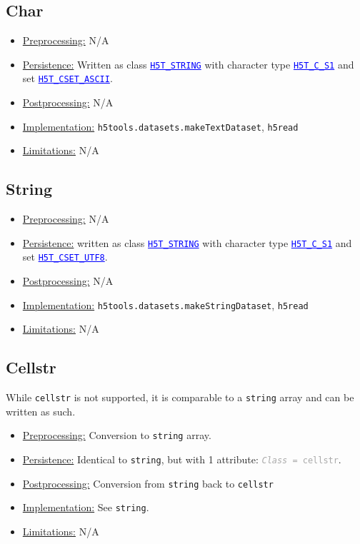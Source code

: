 \documentclass[11pt]{exam}
\newcommand\myurl[1]{\textcolor{blue}{\underline{#1}}}
\newcommand\myfcn[1]{\colorbox{codegray}{\textcolor{codeblue}{\texttt{#1}}}}
\newcommand\matfcn[1]{\textcolor{darkteal}{\texttt{#1}}}
\newcommand\hdftype[1]{\texttt{\myurl{#1}}}
\newcommand\myatt[2]{\textcolor{darkgray}{\texttt{\textit{#1} = #2}}}
\begin{document}
		\subsection{Char}
		\noindent\begin{itemize}
			\item \underline{Preprocessing:} N/A 
			\item \underline{Persistence:} Written as class \hdftype{H5T\_STRING} with character type \hdftype{H5T\_C\_S1} and set \hdftype{H5T\_CSET\_ASCII}.
			\item \underline{Postprocessing:} N/A
			\item \underline{Implementation:} \myfcn{h5tools.datasets.makeTextDataset}, \matfcn{h5read}
			\item \underline{Limitations:} N/A
		\end{itemize}

		\subsection{String}
		\noindent\begin{itemize}
			\item \underline{Preprocessing:} N/A
			\item \underline{Persistence:} written as class \hdftype{H5T\_STRING} with character type \hdftype{H5T\_C\_S1} and set \hdftype{H5T\_CSET\_UTF8}.
			\item \underline{Postprocessing:} N/A
			\item \underline{Implementation:} \myfcn{h5tools.datasets.makeStringDataset}, \matfcn{h5read}
			\item \underline{Limitations:} N/A
		\end{itemize}
		
		\subsection{Cellstr}
		\noindent While \texttt{cellstr} is not supported, it is comparable to a \texttt{string} array and can be written as such.  
		\begin{itemize}
			\item \underline{Preprocessing:} Conversion to \texttt{string} array.
			\item \underline{Persistence:} Identical to \texttt{string}, but with 1 attribute: \myatt{Class}{cellstr}.
			\item \underline{Postprocessing:} Conversion from \texttt{string} back to \texttt{cellstr}
			\item \underline{Implementation:} See \texttt{string}.
			\item \underline{Limitations:} N/A
		\end{itemize}
\end{document}
